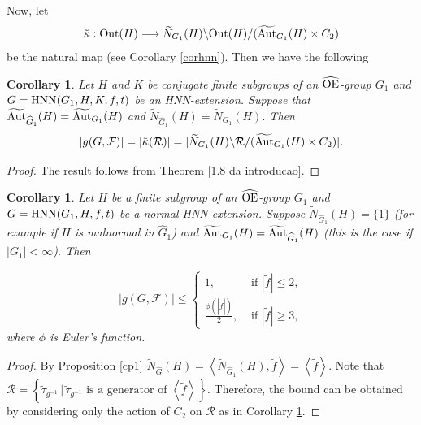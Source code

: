 \documentclass[a4paper,12pt]{article}
\newtheorem{cor}[thm]{Corollary}
\newcommand{\Oe}{\rm \widehat{OE}}
\newcommand{\cR}{{\cal R}}
\def\aut {{\rm Aut}}
\def\out {{\rm Out}}
\def\hnn {{\rm HNN}}
\begin{document}
{Now, let 
\begin{equation} \label{kappa function} \tilde\kappa: \out(H)\longrightarrow \widetilde{N}_{G_1}(H) \backslash \out(H)/  ( \widetilde{\aut}_{G_1}(H) \times C_2)\end{equation}
be the natural map (see Corollary \ref{corhnn}).
Then we have the following 


\begin{cor} \label{nova conta conjugadoss} Let $H$ and $K$ be conjugate finite subgroups of an $\Oe$-group $G_1$ and $G=\hnn(G_1,H,K,f,t)$ be an HNN-extension. Suppose that $\widetilde{\aut}_{\widehat G_1}(H)\\=\widetilde{\aut}_{G_1}(H)$ and $\widetilde{N}_{\widehat G_1}(H)=\widetilde{N}_{ G_1}(H).$  %
Then $$|g(G, \mathcal{F})| = |\tilde \kappa(\cR)|=| \widetilde{N}_{G_1}(H) \backslash \cR/  ( \widetilde{\aut}_{G_1}(H) \times C_2)|.$$ 
\end{cor}

\begin{proof} The result follows from Theorem \ref{1.8 da introducao}. 
\end{proof}


\begin{cor} \label{cotas n} Let $H$ be a finite subgroup of an $\Oe$-group $G_1$ and $G=\hnn(G_1,H,f,t)$  be a normal HNN-extension.  Suppose $\widetilde{N}_{\widehat G_1}(H)=\{1\}$ (for example if $H$ is malnormal in $\widehat G_1$) and $\widetilde{\aut}_{ G_1}(H)=\widetilde{\aut}_{\widehat{G}_1}(H)$ (this is the case if $|G_1|<\infty$). Then 

$$|g(G, \mathcal{F})|\leq \left\{\begin{array}{cc}
  1,&\mbox{ if } |\tilde f| \leq 2,\\
\displaystyle\frac{\phi(|\tilde f|)}{2} , &\mbox{ if } |\tilde f| \geq 3,
\end{array}\right.$$
where $\phi$ is Euler's function.  
\end{cor}

\begin{proof}
By Proposition \ref{cp1} $\widetilde{N}_{\widehat{G}}(H)=\left \langle \widetilde{N}_{\widehat{G }_1}(H), \tilde{f} \right\rangle=\left \langle \tilde{f} \right\rangle.$ Note that  $\mathcal{R}=\left\{ \tilde{\tau}_{g^{-1}}\,|\, \tilde{\tau}_{g^{-1}} \mbox{ is a generator of } \left \langle \tilde{f}\right \rangle \right\}.$ Therefore, the bound can be obtained by considering only the action of $C_2$ on $\mathcal{R}$ as in Corollary \ref{nova conta conjugadoss}. 
\end{proof} 

}
\end{document}
